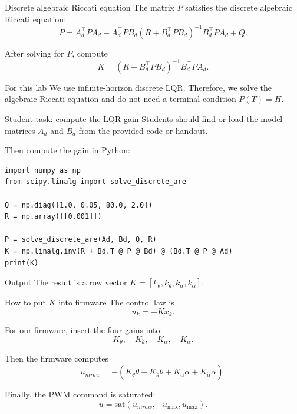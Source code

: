 \documentclass[aspectratio=169]{beamer}
\begin{document}
\begin{frame}{Discrete algebraic Riccati equation}
The matrix $P$ satisfies the discrete algebraic Riccati equation:
\[
P
=
A_d^\top P A_d
-
A_d^\top P B_d
(R+B_d^\top P B_d)^{-1}
B_d^\top P A_d
+Q.
\]

\vspace{0.2cm}

After solving for $P$, compute
\[
K=(R+B_d^\top PB_d)^{-1}B_d^\top PA_d.
\]

\vspace{0.2cm}
\begin{alertblock}{For this lab}
\small
We use infinite-horizon discrete LQR. Therefore, we solve the algebraic Riccati equation and do not need a terminal condition $P(T)=H$.
\end{alertblock}
\end{frame}

\begin{frame}[fragile]{Student task: compute the LQR gain}
Students should find or load the model matrices $A_d$ and $B_d$ from the provided code or handout.

\vspace{0.15cm}

Then compute the gain in Python:
\begin{lstlisting}[basicstyle=\ttfamily\tiny]
import numpy as np
from scipy.linalg import solve_discrete_are

Q = np.diag([1.0, 0.05, 80.0, 2.0])
R = np.array([[0.001]])

P = solve_discrete_are(Ad, Bd, Q, R)
K = np.linalg.inv(R + Bd.T @ P @ Bd) @ (Bd.T @ P @ Ad)
print(K)
\end{lstlisting}

\vspace{0.12cm}
\begin{block}{Output}
\small
The result is a row vector $K=[k_\theta,k_{\dot\theta},k_\alpha,k_{\dot\alpha}]$.
\end{block}
\end{frame}

\begin{frame}{How to put $K$ into firmware}
The control law is
\[
u_k=-Kx_k.
\]

For our firmware, insert the four gains into:
\[
K_\theta,
\quad
K_{\dot\theta},
\quad
K_\alpha,
\quad
K_{\dot\alpha}.
\]

\vspace{0.2cm}

Then the firmware computes
\[
u_{
m raw}
=-(K_\theta\theta
+K_{\dot\theta}\dot\theta
+K_\alpha\alpha
+K_{\dot\alpha}\dot\alpha).
\]

\vspace{0.2cm}

Finally, the PWM command is saturated:
\[
u=\mathrm{sat}(u_{
m raw},-u_{\max},u_{\max}).
\]
\end{frame}
\end{document}
